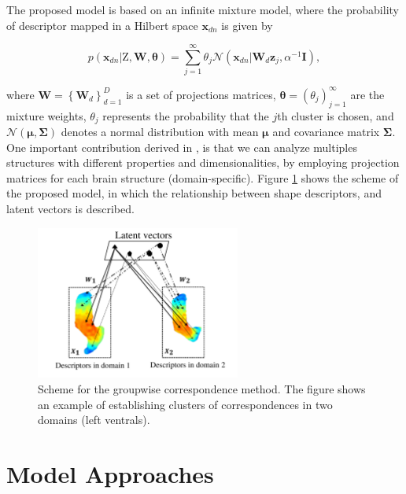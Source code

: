 \documentclass[]{article}
\newcommand{\Z}{\boldsymbol{\mathrm{Z}}}
\newcommand{\indobj}{\mathbf{x}_{dn}}
\newcommand{\projMatI}{\mathbf{W}_d}
\newcommand{\lvecI}{\mathbf{z}_j}
\begin{document}
The proposed model is based on an infinite mixture model, where the
probability of descriptor mapped in a Hilbert space $\indobj$ is given by

\begin{equation}
p\left( {{\indobj}|{\Z},{\boldsymbol{{W}}},{\boldsymbol{\theta }}} \right) = \sum\limits_{j = 1}^\infty  {{\theta _j}\mathcal{N}\left(\indobj|\projMatI\lvecI,\alpha^{-1}\mathbf{I}\right)}, 
\label{eq:llNLmodel}
\end{equation}

where $\boldsymbol{{W}} = \left\{\projMatI \right\}_{d=1}^{D}$ is a set of projections
matrices, $\boldsymbol{\theta}=\left(\theta_j\right)_{j=1}^{\infty}$
are the mixture weights, $\theta_j$ represents the probability that
the $j$th cluster is chosen, and
$\mathcal{N}\left(\boldsymbol{\mu},\boldsymbol{\Sigma}\right)$ denotes
a normal distribution with mean $\boldsymbol{\mu}$ and covariance
matrix $\boldsymbol{\Sigma}$. One important contribution derived in \cite{Iwata13}, is that we can analyze multiples structures with different properties and dimensionalities, by employing projection matrices for each brain structure (domain-specific). Figure
\ref{fig:pipeline} shows the scheme of the proposed model, in which
the relationship between shape descriptors, and
latent vectors is described.

\begin{figure}[h!]
\centering
\includegraphics[width=0.6\textwidth]{img/pipelineGroupCorr}
\caption{Scheme for the groupwise correspondence method. The
  figure shows an example of establishing clusters of correspondences
  in two domains (left ventrals).}
\label{fig:pipeline}
\end{figure} 

\section{Model Approaches}
\end{document}
